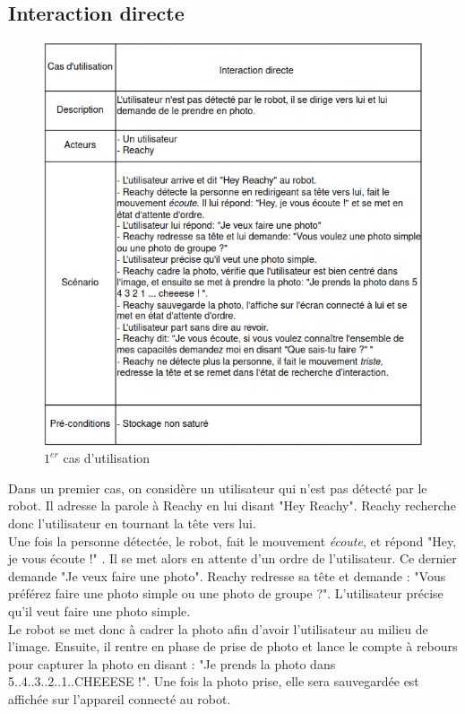 \subsection{Interaction directe}
\begin{figure}[!ht]
    \centering
    \includegraphics[scale = 0.52]{use_case1.png}
    \caption{$1^{er}$ cas d'utilisation}
\end{figure}
Dans un premier cas, on considère un utilisateur qui n'est pas détecté par le robot. Il adresse la parole à Reachy en lui disant "Hey Reachy". Reachy recherche donc l'utilisateur en tournant la tête vers lui. \\

Une fois la personne détectée, le robot, fait le mouvement \textit{écoute}, et répond "Hey, je vous écoute !" . Il se met alors en attente d'un ordre de l'utilisateur. Ce dernier demande "Je veux faire une photo". Reachy redresse sa tête et demande : "Vous préférez faire une photo simple ou une photo de groupe ?". L'utilisateur précise qu'il veut faire une photo simple. \\

Le robot se met donc à cadrer la photo afin d'avoir l'utilisateur au milieu de l'image. Ensuite, il rentre en phase de prise de photo et lance le compte à rebours pour capturer la photo en disant : "Je prends la photo dans 5..4..3..2..1..CHEEESE !". Une fois la photo prise, elle sera sauvegardée est affichée sur l'appareil connecté au robot.\\ 


